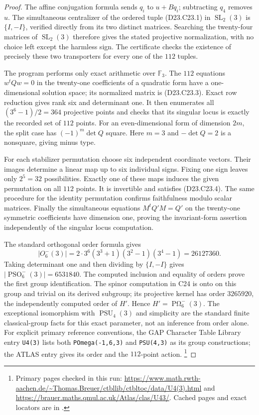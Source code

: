 \begin{proof}
The affine conjugation formula sends $q_i$ to $u+Bq_i$;
subtracting $q_4$ removes $u$. The simultaneous centralizer of
the ordered tuple (D23.C23.1) in $\operatorname{SL}_2(3)$ is
$\{I,-I\}$, verified directly from its two distinct matrices.
Searching the twenty-four matrices of $\operatorname{SL}_2(3)$
therefore gives the stated projective normalization, with no
choice left except the harmless sign. The certificate checks
the existence of precisely these two transporters for every
one of the $112$ tuples.

The program 
performs only exact arithmetic over $\mathbb F_3$.
The $112$ equations $w^tQw=0$ in the twenty-one coefficients
of a quadratic form have a one-dimensional solution space;
its normalized matrix is (D23.C23.3). Exact row reduction gives
rank six and determinant one. It then enumerates all
$(3^6-1)/2=364$ projective points and checks that its singular
locus is exactly the recorded set of $112$ points. For an
even-dimensional form of dimension $2m$, the split case has
$(-1)^m\det Q$ square. Here $m=3$ and $-\det Q=2$ is a
nonsquare, giving minus type.

For each stabilizer permutation choose six independent
coordinate vectors. Their images determine a linear map up
to six individual signs. Fixing one sign leaves only
$2^5=32$ possibilities. Exactly one of these maps induces the
given permutation on all $112$ points. It is invertible and
satisfies (D23.C23.4). The same procedure for the identity
permutation confirms faithfulness modulo scalar matrices.
Finally the simultaneous equations $M^tQ'M=Q'$ on the
twenty-one symmetric coefficients have dimension one, proving
the invariant-form assertion independently of the singular
locus computation.

The standard orthogonal order formula gives
\[
 |O_6^-(3)|=2\cdot3^6(3^3+1)(3^2-1)(3^4-1)=26127360.
\]
Taking determinant one and then dividing by $\{I,-I\}$
gives $|\operatorname{PSO}_6^-(3)|=6531840$.
The computed inclusion and equality of orders prove the
first group identification. The spinor computation in C24
is onto on this group and trivial on its derived subgroup;
its projective kernel has order $3265920$, the independently
computed order of $H'$. Hence $H'=\operatorname{P\Omega}_6^-(3)$.
The exceptional isomorphism with $\operatorname{PSU}_4(3)$
and simplicity are the standard finite classical-group facts
for this exact parameter, not an inference from order alone.
For explicit primary reference conventions, the GAP Character
Table Library entry \texttt{U4(3)} lists both
\texttt{POmega(-1,6,3)} and \texttt{PSU(4,3)} as its group
constructions; the ATLAS entry gives its order and the
$112$-point action.
\footnote{Primary pages checked in this run:
\url{https://www.math.rwth-aachen.de/~Thomas.Breuer/ctbllib/ctbltoc/data/U4(3).html}
and \url{https://brauer.maths.qmul.ac.uk/Atlas/clas/U43/}.
Cached pages and exact locators are in
.}
\end{proof}

